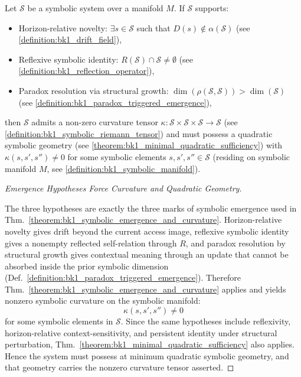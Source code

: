 \begin{theorem}
\label{theorem:bk1_symbolic_emergence_theorem_thermodynamics}
Let $\mathcal{S}$ be a symbolic system over a manifold $M$. If $\mathcal{S}$ supports:
\begin{itemize}
  \item Horizon-relative novelty: $\exists s \in \mathcal{S}$ such that $D(s) \notin \alpha(\mathcal{S})$ (see \ref{definition:bk1_drift_field}),
  \item Reflexive symbolic identity: $R(\mathcal{S}) \cap \mathcal{S} \neq \emptyset$ (see \ref{definition:bk1_reflection_operator}),
  \item Paradox resolution via structural growth: $\dim(\rho(\mathcal{S}, \mathcal{S})) > \dim(\mathcal{S})$ (see \ref{definition:bk1_paradox_triggered_emergence}),
\end{itemize}
then $\mathcal{S}$ admits a non-zero curvature tensor $\kappa: \mathcal{S} \times \mathcal{S} \times \mathcal{S} \to \mathcal{S}$ (see \ref{definition:bk1_symbolic_riemann_tensor}) and must possess a quadratic symbolic geometry (see \ref{theorem:bk1_minimal_quadratic_sufficiency}) with $\kappa(s,s',s'') \neq 0$ for some symbolic elements $s, s', s'' \in \mathcal{S}$ (residing on symbolic manifold $M$, see \ref{definition:bk1_symbolic_manifold}).
\end{theorem}
\begin{proof}[Emergence Hypotheses Force Curvature and Quadratic Geometry]
\label{proof:bk1_symbolic_emergence_theorem_thermodynamics}
\leavevmode

The three hypotheses are exactly the three marks of symbolic emergence used in
Thm.~\ref{theorem:bk1_symbolic_emergence_and_curvature}. Horizon-relative
novelty gives drift beyond the current access image, reflexive symbolic identity
gives a nonempty reflected self-relation through \(R\), and paradox resolution
by structural growth gives contextual meaning through an update that cannot be
absorbed inside the prior symbolic dimension
(Def.~\ref{definition:bk1_paradox_triggered_emergence}). Therefore
Thm.~\ref{theorem:bk1_symbolic_emergence_and_curvature} applies and yields
nonzero symbolic curvature on the symbolic manifold:
\[
\kappa(s,s',s'')\neq 0
\]
for some symbolic elements in \(\mathcal{S}\). Since the same hypotheses include
reflexivity, horizon-relative context-sensitivity, and persistent identity under
structural perturbation, Thm.~\ref{theorem:bk1_minimal_quadratic_sufficiency}
also applies. Hence the system must possess at minimum quadratic symbolic
geometry, and that geometry carries the nonzero curvature tensor asserted.
\end{proof}
